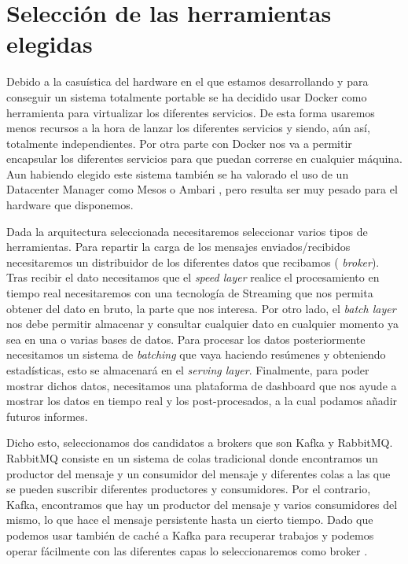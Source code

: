 \section{Selección de las herramientas elegidas\label{toolSelect}}

Debido a la casuística del hardware en el que estamos desarrollando y para
conseguir un sistema totalmente portable se ha decidido usar Docker como
herramienta para virtualizar los diferentes servicios. De esta forma
usaremos menos recursos a la hora de lanzar los diferentes servicios y
siendo, aún así, totalmente independientes. Por otra parte con Docker
nos va a permitir encapsular los diferentes servicios para que puedan
correrse en cualquier máquina. Aun habiendo elegido este sistema también se
ha valorado el uso de un Datacenter Manager como Mesos o Ambari
\cite{Hrr-1}, pero resulta ser muy pesado para el hardware que disponemos.

Dada la arquitectura seleccionada necesitaremos seleccionar varios tipos de
herramientas. Para repartir la carga de los mensajes enviados/recibidos
necesitaremos un distribuidor de los diferentes datos que recibamos ({\em
  broker}). Tras recibir el dato necesitamos que el {\em speed layer}
realice el procesamiento en tiempo real necesitaremos con una tecnología de
Streaming que nos permita obtener del dato en bruto, la parte que nos
interesa. Por otro lado, el {\em batch layer} nos debe permitir almacenar y
consultar cualquier dato en cualquier momento ya sea en una o varias bases
de datos. Para procesar los datos posteriormente necesitamos un sistema de
{\em batching} que vaya haciendo resúmenes y obteniendo estadísticas, esto
se almacenará en el {\em serving layer}. Finalmente, para poder mostrar
dichos datos, necesitamos una plataforma de dashboard que nos ayude a
mostrar los datos en tiempo real y los post-procesados, a la cual podamos
añadir futuros informes.

Dicho esto, seleccionamos dos candidatos a brokers que son Kafka y
RabbitMQ. RabbitMQ consiste en un sistema de colas tradicional donde
encontramos un productor del mensaje y un consumidor del mensaje y
diferentes colas a las que se pueden suscribir diferentes productores y
consumidores. Por el contrario, Kafka, encontramos que hay un productor del
mensaje y varios consumidores del mismo, lo que hace el mensaje persistente
hasta un cierto tiempo. Dado que podemos usar también de caché a Kafka para
recuperar trabajos y podemos operar fácilmente con las diferentes capas lo
seleccionaremos como broker \cite{Hrr-2}.


